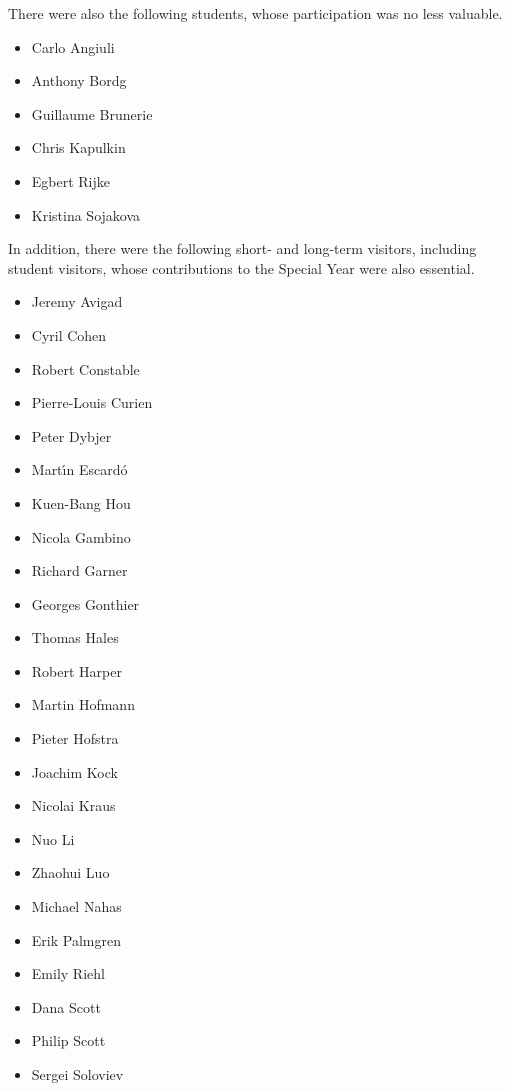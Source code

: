 \noindent There were also the following students, whose participation was no less valuable.

\begin{multicols}{\OPTprefacecols}{
\begin{itemize}
\item[] Carlo Angiuli
\item[] Anthony Bordg
\item[] Guillaume Brunerie
\item[] Chris Kapulkin
\item[] Egbert Rijke
\item[] Kristina Sojakova
\end{itemize}
}
\end{multicols}

\noindent In addition, there were the following short- and long-term visitors, including student visitors, whose contributions to the Special Year were also essential.

\begin{multicols}{\OPTprefacecols}{
\begin{itemize}
\item[] Jeremy Avigad
\item[] Cyril Cohen
\item[] Robert Constable
\item[] Pierre-Louis Curien
\item[] Peter Dybjer
\item[] Mart{\'\i}n Escard{\'o}
\item[] Kuen-Bang Hou
\item[] Nicola Gambino
\item[] Richard Garner
\item[] Georges Gonthier
\item[] Thomas Hales
\item[] Robert Harper
\item[] Martin Hofmann
\item[] Pieter Hofstra
\item[] Joachim Kock
\item[] Nicolai Kraus
\item[] Nuo Li
\item[] Zhaohui Luo
\item[] Michael Nahas
\item[] Erik Palmgren
\item[] Emily Riehl
\item[] Dana Scott
\item[] Philip Scott
\item[] Sergei Soloviev
\end{itemize}
}
\end{multicols}

